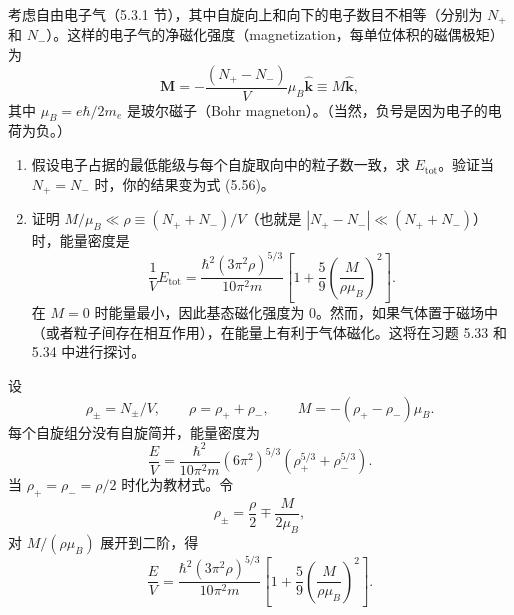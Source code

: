 \begin{question}
考虑自由电子气（5.3.1 节），其中自旋向上和向下的电子数目不相等（分别为 $N_+$ 和 $N_-$）。这样的电子气的净磁化强度（magnetization，每单位体积的磁偶极矩）为
\[
\mathbf M=-\frac{(N_+-N_-)}{V}\mu_B\hat{\mathbf k}\equiv M\hat{\mathbf k},
\]
其中 $\mu_B=e\hbar/2m_e$ 是玻尔磁子（Bohr magneton）。（当然，负号是因为电子的电荷为负。）
\begin{enumerate}
\item 假设电子占据的最低能级与每个自旋取向中的粒子数一致，求 $E_{\mathrm{tot}}$。验证当 $N_+=N_-$ 时，你的结果变为式 (5.56)。
\item 证明 $M/\mu_B\ll\rho\equiv(N_++N_-)/V$（也就是 $|N_+-N_-|\ll(N_++N_-)$）时，能量密度是
\[
\frac{1}{V}E_{\mathrm{tot}}=\frac{\hbar^2(3\pi^2\rho)^{5/3}}{10\pi^2m}
\left[1+\frac{5}{9}\left(\frac{M}{\rho\mu_B}\right)^2\right].
\]
在 $M=0$ 时能量最小，因此基态磁化强度为 0。然而，如果气体置于磁场中（或者粒子间存在相互作用），在能量上有利于气体磁化。这将在习题 5.33 和 5.34 中进行探讨。
\end{enumerate}

\par\smallskip
{}

\end{question}
\begin{solution}

设
\[
\rho_\pm=N_\pm/V,
\qquad \rho=\rho_++\rho_-,
\qquad M=-(\rho_+-\rho_-)\mu_B.
\]
每个自旋组分没有自旋简并，能量密度为
\[
\frac{E}{V}=\frac{\hbar^2}{10\pi^2m}(6\pi^2)^{5/3}
(\rho_+^{5/3}+\rho_-^{5/3}).
\]
当 $\rho_+=\rho_-=\rho/2$ 时化为教材式。令
\[
\rho_\pm=\frac\rho2\mp\frac{M}{2\mu_B},
\]
对 $M/(\rho\mu_B)$ 展开到二阶，得
\[
\frac{E}{V}=\frac{\hbar^2(3\pi^2\rho)^{5/3}}{10\pi^2m}
\left[1+\frac59\left(\frac{M}{\rho\mu_B}\right)^2\right].
\]

\end{solution}

